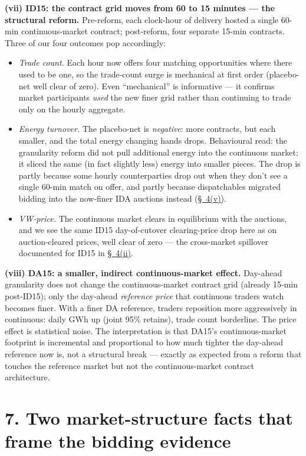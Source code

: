\documentclass[11pt]{article}
\begin{document}
\noindent\textbf{(vii) ID15: the contract grid moves from 60 to 15 minutes --- the structural reform.} Pre-reform, each clock-hour of delivery hosted a single 60-min continuous-market contract; post-reform, four separate 15-min contracts. Three of our four outcomes pop accordingly:
\begin{itemize}\setlength{\itemsep}{1pt}
\item \emph{Trade count.} Each hour now offers four matching opportunities where there used to be one, so the trade-count surge is mechanical at first order (placebo-net well clear of zero). Even ``mechanical'' is informative --- it confirms market participants \emph{used} the new finer grid rather than continuing to trade only on the hourly aggregate.
\item \emph{Energy turnover.} The placebo-net is \emph{negative}: more contracts, but each smaller, and the total energy changing hands drops. Behavioural read: the granularity reform did not pull additional energy into the continuous market; it sliced the same (in fact slightly less) energy into smaller pieces. The drop is partly because some hourly counterparties drop out when they don't see a single 60-min match on offer, and partly because dispatchables migrated bidding into the now-finer IDA auctions instead (\hyperref[sec:4v]{\S~4(v)}).
\item \emph{VW-price.} The continuous market clears in equilibrium with the auctions, and we see the same ID15 day-of-cutover clearing-price drop here as on auction-cleared prices, well clear of zero --- the cross-market spillover documented for ID15 in \hyperref[sec:4ii]{\S~4(ii)}.
\end{itemize}

\noindent\textbf{(viii) DA15: a smaller, indirect continuous-market effect.} Day-ahead granularity does not change the continuous-market contract grid (already 15-min post-ID15); only the day-ahead \emph{reference price} that continuous traders watch becomes finer. With a finer DA reference, traders reposition more aggressively in continuous: daily GWh up (joint 95\% retains), trade count borderline. The price effect is statistical noise. The interpretation is that DA15's continuous-market footprint is incremental and proportional to how much tighter the day-ahead reference now is, not a structural break --- exactly as expected from a reform that touches the reference market but not the continuous-market contract architecture.

\section*{7. Two market-structure facts that frame the bidding evidence}
\label{sec:context}
\end{document}
